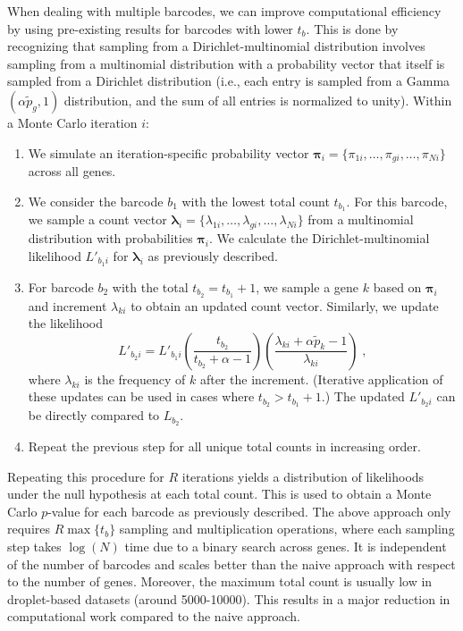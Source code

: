 \documentclass{article}
\begin{document}
When dealing with multiple barcodes, we can improve computational efficiency by using pre-existing results for barcodes with lower $t_b$.
This is done by recognizing that sampling from a Dirichlet-multinomial distribution involves sampling from a multinomial distribution with a probability vector that itself is sampled from a Dirichlet distribution (i.e., each entry is sampled from a Gamma$(\alpha\tilde{p}_g, 1)$ distribution, and the sum of all entries is normalized to unity).
Within a Monte Carlo iteration $i$:
\begin{enumerate}
\item We simulate an iteration-specific probability vector $\pmb{\pi}_i = \{ \pi_{1i}, \ldots, \pi_{gi}, \ldots, \pi_{Ni} \}$ across all genes.
\item We consider the barcode $b_1$ with the lowest total count $t_{b_1}$. 
For this barcode, we sample a count vector $\pmb{\lambda}_{i} = \{ \lambda_{1i}, \ldots, \lambda_{gi}, \ldots, \lambda_{Ni} \}$ from a multinomial distribution with probabilities $\pmb{\pi}_i$. 
We calculate the Dirichlet-multinomial likelihood $L'_{b_1i}$ for $\pmb{\lambda}_{i}$ as previously described.
\item For barcode $b_2$ with the total $t_{b_2}=t_{b_1}+1$, we sample a gene $k$ based on $\pmb{\pi}_i$ and increment $\lambda_{ki}$ to obtain an updated count vector.
Similarly, we update the likelihood 
\[
    L'_{b_2i} = L'_{b_1i} \left( \frac{t_{b_2}}{t_{b_2} + \alpha - 1} \right) \left( \frac{\lambda_{ki} + \alpha\tilde{p}_k - 1}{\lambda_{ki}} \right) \;,
\]
where $\lambda_{ki}$ is the frequency of $k$ after the increment.
(Iterative application of these updates can be used in cases where $t_{b_2} > t_{b_1}+1$.)
The updated $L'_{b_2i}$ can be directly compared to $L_{b_2}$.
\item Repeat the previous step for all unique total counts in increasing order.
\end{enumerate}
Repeating this procedure for $R$ iterations yields a distribution of likelihoods under the null hypothesis at each total count.
This is used to obtain a Monte Carlo $p$-value for each barcode as previously described.
The above approach only requires $R \max\{t_b\}$ sampling and multiplication operations, where each sampling step takes $\log(N)$ time due to a binary search across genes.
It is independent of the number of barcodes and scales better than the naive approach with respect to the number of genes.
Moreover, the maximum total count is usually low in droplet-based datasets (around 5000-10000).
This results in a major reduction in computational work compared to the naive approach.
\end{document}
